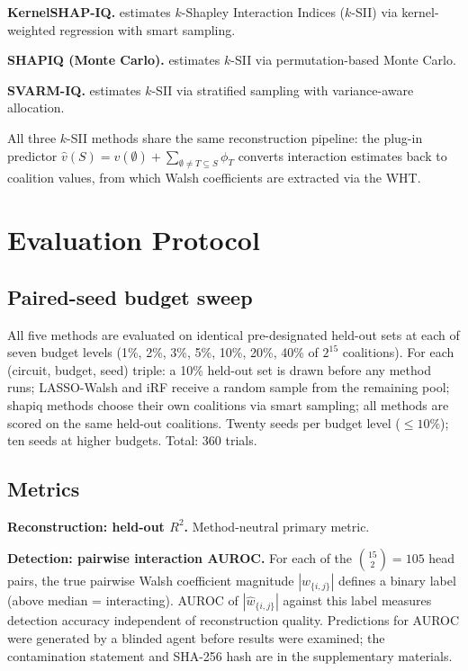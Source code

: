 \documentclass[10pt]{article}
\begin{document}
\textbf{KernelSHAP-IQ.}
\citet{fumagalli2024kernelshapiq} estimates $k$-Shapley Interaction
Indices ($k$-SII) \citep{bordt2023shapley, grabisch1997korder} via
kernel-weighted regression with smart sampling.

\textbf{SHAPIQ (Monte Carlo).}
\citet{muschalik2024shapiq} estimates $k$-SII via
permutation-based Monte Carlo.

\textbf{SVARM-IQ.}
\citet{kolpaczki2024svarmiq} estimates $k$-SII via stratified
sampling with variance-aware allocation.

All three $k$-SII methods share the same reconstruction pipeline:
the plug-in predictor
$\hat{v}(S) = v(\emptyset) + \sum_{\emptyset \neq T \subseteq S} \phi_T$
converts interaction estimates back to coalition values, from which
Walsh coefficients are extracted via the WHT.


\section{Evaluation Protocol}
\label{sec:protocol}

\subsection{Paired-seed budget sweep}

All five methods are evaluated on identical pre-designated held-out
sets at each of seven budget levels (1\%, 2\%, 3\%, 5\%, 10\%, 20\%,
40\% of $2^{15}$ coalitions). For each (circuit, budget, seed) triple:
a 10\% held-out set is drawn before any method runs; LASSO-Walsh and
iRF receive a random sample from the remaining pool; shapiq methods
choose their own coalitions via smart sampling; all methods are scored
on the same held-out coalitions. Twenty seeds per budget level
($\leq 10\%$); ten seeds at higher budgets. Total: 360 trials.

\subsection{Metrics}

\textbf{Reconstruction: held-out $R^2$.} Method-neutral primary
metric.

\textbf{Detection: pairwise interaction AUROC.} For each of the
$\binom{15}{2} = 105$ head pairs, the true pairwise Walsh coefficient
magnitude $|w_{\{i,j\}}|$ defines a binary label (above median =
interacting). AUROC of $|\hat{w}_{\{i,j\}}|$ against this label
measures detection accuracy independent of reconstruction quality.
Predictions for AUROC were generated by a blinded agent before
results were examined; the contamination statement and SHA-256 hash
are in the supplementary materials.
\end{document}

